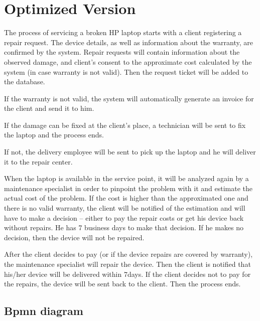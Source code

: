 \documentclass[12pt]{article}
\begin{document}
  \section{Optimized Version}

  The process of servicing a broken HP laptop starts with a client registering a repair request.
  The device details, as well as information about the warranty, are confirmed by the system.
  Repair requests will contain information about the observed damage, and client’s consent to the approximate cost calculated by the system (in case warranty is not valid).
  Then the request ticket will be added to the database.
  
  If the warranty is not valid, the system will automatically generate an invoice for the client and send it to him.
  
  If the damage can be fixed at the client’s place, a technician will be sent to fix the laptop and the process ends.
  
  If not, the delivery employee will be sent to pick up the laptop and he will deliver it to the repair center.
  
  When the laptop is available in the service point, it will be analyzed again by a maintenance specialist in order to pinpoint the problem with it and estimate the actual cost of the problem.
  If the cost is higher than the approximated one and there is no valid warranty, the client will be notified of the estimation and will have to make a decision – either to pay the repair costs or get his device back without repairs.
  He has 7 business days to make that decision.
  If he makes no decision, then the device will not be repaired.
  
  After the client decides to pay (or if the device repairs are covered by warranty), the maintenance specialist will repair the device.
  Then the client is notified that his/her device will be delivered within 7days.
  If the client decides not to pay for the repairs, the device will be sent back to the client.
  Then the process ends.


  \subsection{Bpmn diagram}
\end{document}
